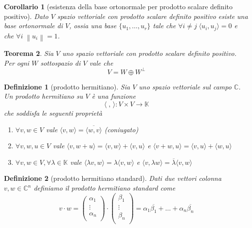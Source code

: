 \documentclass[9pt, a4paper]{article}
\newcommand{\C}{\mathbb{C}}
\newcommand{\K}{\mathbb{K}}
\newcommand{\letvsC}{Sia $ V $ uno spazio vettoriale sul campo $ \C $}
\newcommand{\scprd}[2]{\langle #1, #2 \rangle}
\newcommand{\norm}[1]{\left\lVert#1\right\rVert}
\theoremstyle{mythm}
\newtheorem{definition}{Definizione}[section]
\newtheorem{thm}{Teorema}[section]
\newtheorem{corollary}[thm]{Corollario}
\begin{document}
\begin{corollary}[esistenza della base ortonormale per prodotto scalare definito positivo]
	Dato $ V $ spazio vettoriale con prodotto scalare definito positivo esiste una base ortonormale di $ V $, ossia una base $ \{u_1,\ldots, u_r\} $ tale che $ \forall i \neq j \; \scprd{u_i}{u_j} = 0 $ e che $ \forall i \; \norm{u_i} = 1 $.
\end{corollary}

\begin{thm}
	Sia $ V $ uno spazio vettoriale con prodotto scalare definito positivo. Per ogni $ W $ sottospazio di $ V $ vale che \[V = W \oplus W^{\perp}\]
\end{thm}

\begin{definition}[prodotto hermitiano]
	\letvsC. Un prodotto hermitiano su $ V $ è una funzione \[\scprd{\;}{\,} \colon V \times V \to \K \] che soddisfa le seguenti proprietà
	\begin{enumerate}[label=(\roman*)]
		\item $ \forall v,w \in V $ vale $ \scprd{v}{w} = \overline{\scprd{w}{v}} $ (coniugato)
		\item $ \forall v, w, u \in V $ vale $ \scprd{v}{w + u} = \scprd{v}{w} + \scprd{v}{u} $ e $ \scprd{v + w}{u} = \scprd{v}{u} + \scprd{w}{u} $
		\item $ \forall v, w \in V, \forall \lambda \in \K $ vale $ \scprd{\lambda v}{w} = \lambda \scprd{v}{w} $ e $ \scprd{v}{\lambda w} = \overline{\lambda} \scprd{v}{w} $
	\end{enumerate}	
\end{definition}

\begin{definition}[prodotto hermitiano standard]
	Dati due vettori colonna $ v, w \in \C^n $ definiamo il prodotto hermitiano standard come 
	\[v \cdot w = 
	\begin{pmatrix}
	\alpha_1 \\
	\vdots \\
	\alpha_n \\ 
	\end{pmatrix}
	\cdot 
	\begin{pmatrix}
	\beta_1 \\
	\vdots \\
	\beta_n \\ 
	\end{pmatrix}
	 = \alpha_1 \overline{\beta_1} + \ldots + \alpha_n \overline{\beta_n}\]
\end{definition}
\end{document}
